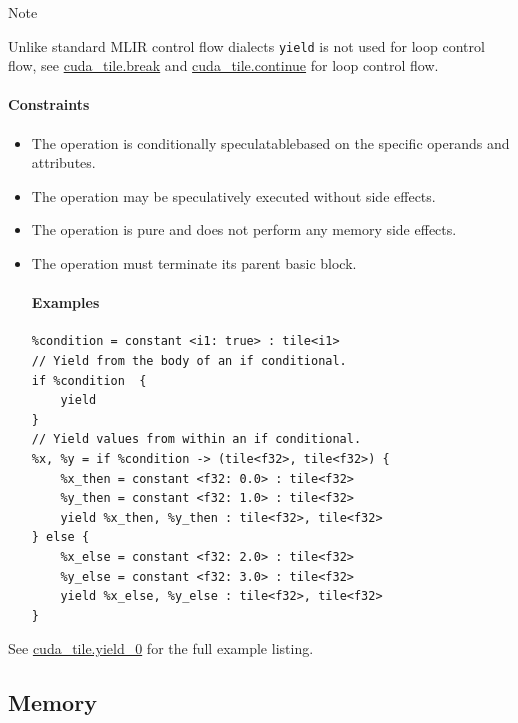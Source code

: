 \documentclass{article}
\begin{document}
Note


Unlike standard MLIR control flow dialects \texttt{yield} is not used for loop control flow, see \href{https://docs.nvidia.com/cuda/tile-ir/latest/sections/operations.html#op-cuda-tile-break}{cuda\_tile.break} and \href{https://docs.nvidia.com/cuda/tile-ir/latest/sections/operations.html#op-cuda-tile-continue}{cuda\_tile.continue} for loop control flow.



\paragraph{Constraints}

\begin{itemize}
\item The operation is conditionally speculatablebased on the specific operands and attributes.
\item The operation may be speculatively executed without side effects.
\item The operation is pure and does not perform any memory side effects.
\item The operation must terminate its parent basic block.


\paragraph{Examples}

\begin{lstlisting}
%condition = constant <i1: true> : tile<i1>
// Yield from the body of an if conditional.
if %condition  {
    yield
}
// Yield values from within an if conditional.
%x, %y = if %condition -> (tile<f32>, tile<f32>) {
    %x_then = constant <f32: 0.0> : tile<f32>
    %y_then = constant <f32: 1.0> : tile<f32>
    yield %x_then, %y_then : tile<f32>, tile<f32>
} else {
    %x_else = constant <f32: 2.0> : tile<f32>
    %y_else = constant <f32: 3.0> : tile<f32>
    yield %x_else, %y_else : tile<f32>, tile<f32>
}
\end{lstlisting}

\end{itemize}
See \href{https://docs.nvidia.com/cuda/tile-ir/latest/sections/appendix.html#example-cuda-tile-yield-0}{cuda\_tile.yield\_0} for the full example listing.




\subsection{Memory}
\end{document}

